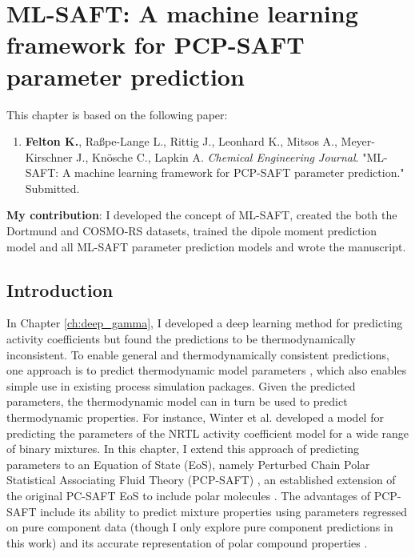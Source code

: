 \chapter{ML-SAFT: A machine learning framework for PCP-SAFT parameter prediction}\label{ch:ml_saft} 
This chapter is based on the following paper:
\begin{enumerate}
\item \textbf{Felton K.}, Ra{\ss}pe-Lange L., Rittig J., Leonhard K., Mitsos A., Meyer-Kirschner J., Kn\"osche C., Lapkin A. \textit{Chemical Engineering Journal}. "ML-SAFT: A machine learning framework for PCP-SAFT parameter prediction." Submitted.
\end{enumerate}

\textbf{My contribution}: I developed the concept of ML-SAFT, created the both the Dortmund and COSMO-RS datasets, trained the dipole moment prediction model and all ML-SAFT parameter prediction models and wrote the manuscript.

\section{Introduction}
In Chapter \ref{ch:deep_gamma}, I developed a deep learning method for predicting activity coefficients but found the predictions to be thermodynamically inconsistent. To enable general and thermodynamically consistent predictions, one approach is to predict thermodynamic model parameters \cite{Abbasi2020, Matsukawa2021, Madani2021, Abdallahelhadj2022, Winter2022}, which also enables simple use in existing process simulation packages. Given the predicted parameters, the thermodynamic model can in turn be used to predict thermodynamic properties. For instance, Winter et al. \cite{Winter2022} developed a model for predicting the parameters of the NRTL activity coefficient model for a wide range of binary mixtures. In this chapter, I extend this approach of predicting parameters to an Equation of State (EoS), namely Perturbed Chain Polar Statistical Associating Fluid Theory (PCP-SAFT) \cite{Gross2001}, an established extension of the original PC-SAFT EoS to include polar molecules \cite{Gross2006}. The advantages of PCP-SAFT include its ability to predict mixture properties using parameters regressed on pure component data (though I only explore pure component predictions in this work) and its accurate representation of polar compound properties \cite{Cripwell2017}. 

